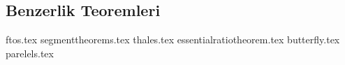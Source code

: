 \subsection{Benzerlik Teoremleri}

{ftos.tex}
\newpage
{segmenttheorems.tex}
\newpage
{thales.tex}
\newpage
{essentialratiotheorem.tex}
\newpage
{butterfly.tex}
\newpage
{parelels.tex}
\newpage